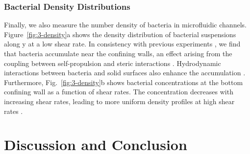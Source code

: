 \subsubsection{Bacterial Density Distributions}
Finally, we also measure the number density of bacteria in microfluidic channels. Figure~\ref{fig:3-density}a shows the density distribution of bacterial suspensions along y at a low shear rate. In consistency with previous experiments \cite{Hill2007, Berke2008, Li2009}, we find that bacteria accumulate near the confining walls, an effect arising from the coupling between self-propulsion and steric interactions \cite{Ezhilan2015}. Hydrodynamic interactions between bacteria and solid surfaces also enhance the accumulation \cite{Berke2008}. Furthermore, Fig.~\ref{fig:3-density}b shows bacterial concentrations at the bottom confining wall as a function of shear rates. The concentration decreases with increasing shear rates, leading to more uniform density profiles at high shear rates \cite{Ezhilan2015}.


\section{Discussion and Conclusion}
